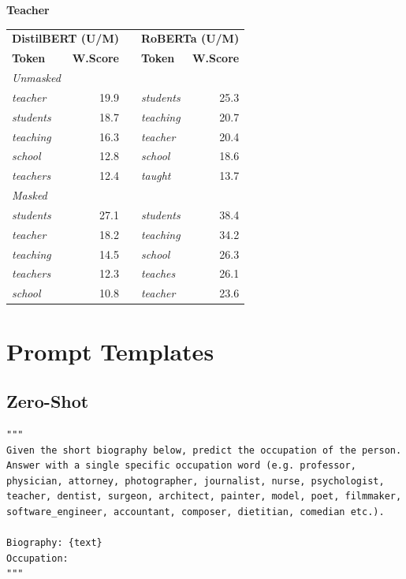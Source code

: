 \documentclass[11pt]{article}
\begin{document}
\vspace{4pt}\noindent\textbf{Teacher}
\begin{center}\scriptsize
\begin{tabular}{lrllr}
\toprule
\multicolumn{2}{c}{\textbf{DistilBERT (U/M)}} & & \multicolumn{2}{c}{\textbf{RoBERTa (U/M)}} \\
\textbf{Token} & \textbf{W.Score} & & \textbf{Token} & \textbf{W.Score} \\
\midrule
\multicolumn{5}{l}{\textit{Unmasked}} \\
\emph{teacher} & 19.9 & & \emph{students} & 25.3 \\
\emph{students} & 18.7 & & \emph{teaching} & 20.7 \\
\emph{teaching} & 16.3 & & \emph{teacher} & 20.4 \\
\emph{school} & 12.8 & & \emph{school} & 18.6 \\
\emph{teachers} & 12.4 & & \emph{taught} & 13.7 \\
\multicolumn{5}{l}{\textit{Masked}} \\
\emph{students} & 27.1 & & \emph{students} & 38.4 \\
\emph{teacher} & 18.2 & & \emph{teaching} & 34.2 \\
\emph{teaching} & 14.5 & & \emph{school} & 26.3 \\
\emph{teachers} & 12.3 & & \emph{teaches} & 26.1 \\
\emph{school} & 10.8 & & \emph{teacher} & 23.6 \\
\bottomrule
\end{tabular}
\end{center}


\newpage
\onecolumn
\section{Prompt Templates}
\subsection{Zero-Shot}
\begin{verbatim}
"""
Given the short biography below, predict the occupation of the person.
Answer with a single specific occupation word (e.g. professor,
physician, attorney, photographer, journalist, nurse, psychologist,
teacher, dentist, surgeon, architect, painter, model, poet, filmmaker,
software_engineer, accountant, composer, dietitian, comedian etc.).

Biography: {text}
Occupation:
"""
\end{verbatim}
\end{document}
